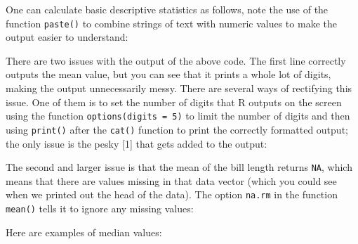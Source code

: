 \documentclass[
  letterpaper,
  DIV=11,
  numbers=noendperiod]{scrreprt}
\newenvironment{Shaded}{\begin{snugshade}}{\end{snugshade}}
\newcommand{\NormalTok}[1]{\textcolor[rgb]{0.00,0.23,0.31}{#1}}
\begin{document}
One can calculate basic descriptive statistics as follows, note the use
of the function \texttt{paste()} to combine strings of text with numeric
values to make the output easier to understand:

\begin{Shaded}
\end{Shaded}

There are two issues with the output of the above code. The first line
correctly outputs the mean value, but you can see that it prints a whole
lot of digits, making the output unnecessarily messy. There are several
ways of rectifying this issue. One of them is to set the number of
digits that R outputs on the screen using the function
\texttt{options(digits\ =\ 5)} to limit the number of digits and then
using \texttt{print()} after the \texttt{cat()} function to print the
correctly formatted output; the only issue is the pesky {[}1{]} that
gets added to the output:

\begin{Shaded}
\end{Shaded}

The second and larger issue is that the mean of the bill length returns
\texttt{NA}, which means that there are values missing in that data
vector (which you could see when we printed out the head of the data).
The option \texttt{na.rm} in the function \texttt{mean()} tells it to
ignore any missing values:

\begin{Shaded}
\end{Shaded}

Here are examples of median values:

\begin{Shaded}
\end{Shaded}
\end{document}
